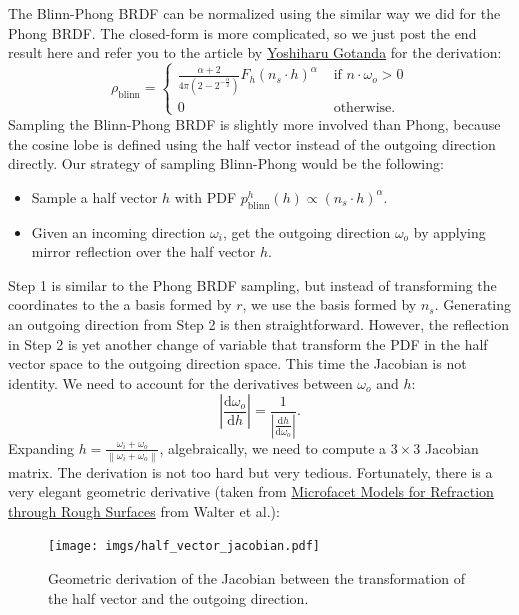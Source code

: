 The Blinn-Phong BRDF can be normalized using the similar way we did for the Phong BRDF. The closed-form is more complicated, so we just post the end result here and refer you to the article by \href{https://renderwonk.com/publications/s2010-shading-course/gotanda/course_note_practical_implementation_at_triace.pdf}{Yoshiharu Gotanda} for the derivation:
\begin{equation}
\rho_{\text{blinn}} = \begin{cases}
\frac{\alpha + 2}{4\pi\left(2 - 2^{-\frac{\alpha}{2}}\right)} F_h \left(n_s \cdot h\right)^{\alpha} & \text{ if } n \cdot \omega_o > 0 \\
0 & \text{ otherwise.} 
\end{cases}
\end{equation}
Sampling the Blinn-Phong BRDF is slightly more involved than Phong, because the cosine lobe is defined using the half vector instead of the outgoing direction directly. Our strategy of sampling Blinn-Phong would be the following:
\begin{itemize}
  \item Sample a half vector $h$ with PDF $p_{\text{blinn}}^h(h) \propto \left(n_s \cdot h\right)^{\alpha}$.
  \item Given an incoming direction $\omega_i$, get the outgoing direction $\omega_o$ by applying mirror reflection over the half vector $h$. 
\end{itemize}
Step 1 is similar to the Phong BRDF sampling, but instead of transforming the coordinates to the a basis formed by $r$, we use the basis formed by $n_s$. Generating an outgoing direction from Step 2 is then straightforward. However, the reflection in Step 2 is yet another change of variable that transform the PDF in the half vector space to the outgoing direction space. This time the Jacobian is not identity. We need to account for the derivatives between $\omega_o$ and $h$:
\begin{equation}
\left|\frac{\mathrm{d}\omega_o}{\mathrm{d}h}\right| = \frac{1}{\left|\frac{\mathrm{d}h}{\mathrm{d}\omega_o}\right|}.
\end{equation}
Expanding $h = \frac{\omega_i + \omega_o}{\left\|\omega_i + \omega_o\right\|}$, algebraically, we need to compute a $3 \times 3$ Jacobian matrix. The derivation is not too hard but very tedious. Fortunately, there is a very elegant geometric derivative (taken from \href{http://www.graphics.cornell.edu/~bjw/microfacetbsdf.pdf}{Microfacet Models for Refraction through Rough Surfaces} from Walter et al.):
\begin{figure}[ht]
    \centering
    \texttt{[image: imgs/half\_vector\_jacobian.pdf]}
    \caption{Geometric derivation of the Jacobian between the transformation of the half vector and the outgoing direction.}
    \label{fig:half_vector_jacobian}
\end{figure}
